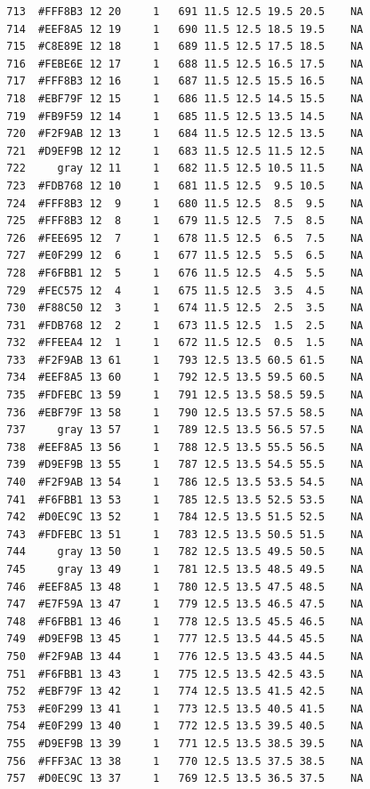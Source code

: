 \documentclass[12pt,twoside]{reedthesis}
\begin{document}
\begin{verbatim}
  713  #FFF8B3 12 20     1   691 11.5 12.5 19.5 20.5    NA
  714  #EEF8A5 12 19     1   690 11.5 12.5 18.5 19.5    NA
  715  #C8E89E 12 18     1   689 11.5 12.5 17.5 18.5    NA
  716  #FEBE6E 12 17     1   688 11.5 12.5 16.5 17.5    NA
  717  #FFF8B3 12 16     1   687 11.5 12.5 15.5 16.5    NA
  718  #EBF79F 12 15     1   686 11.5 12.5 14.5 15.5    NA
  719  #FB9F59 12 14     1   685 11.5 12.5 13.5 14.5    NA
  720  #F2F9AB 12 13     1   684 11.5 12.5 12.5 13.5    NA
  721  #D9EF9B 12 12     1   683 11.5 12.5 11.5 12.5    NA
  722     gray 12 11     1   682 11.5 12.5 10.5 11.5    NA
  723  #FDB768 12 10     1   681 11.5 12.5  9.5 10.5    NA
  724  #FFF8B3 12  9     1   680 11.5 12.5  8.5  9.5    NA
  725  #FFF8B3 12  8     1   679 11.5 12.5  7.5  8.5    NA
  726  #FEE695 12  7     1   678 11.5 12.5  6.5  7.5    NA
  727  #E0F299 12  6     1   677 11.5 12.5  5.5  6.5    NA
  728  #F6FBB1 12  5     1   676 11.5 12.5  4.5  5.5    NA
  729  #FEC575 12  4     1   675 11.5 12.5  3.5  4.5    NA
  730  #F88C50 12  3     1   674 11.5 12.5  2.5  3.5    NA
  731  #FDB768 12  2     1   673 11.5 12.5  1.5  2.5    NA
  732  #FFEEA4 12  1     1   672 11.5 12.5  0.5  1.5    NA
  733  #F2F9AB 13 61     1   793 12.5 13.5 60.5 61.5    NA
  734  #EEF8A5 13 60     1   792 12.5 13.5 59.5 60.5    NA
  735  #FDFEBC 13 59     1   791 12.5 13.5 58.5 59.5    NA
  736  #EBF79F 13 58     1   790 12.5 13.5 57.5 58.5    NA
  737     gray 13 57     1   789 12.5 13.5 56.5 57.5    NA
  738  #EEF8A5 13 56     1   788 12.5 13.5 55.5 56.5    NA
  739  #D9EF9B 13 55     1   787 12.5 13.5 54.5 55.5    NA
  740  #F2F9AB 13 54     1   786 12.5 13.5 53.5 54.5    NA
  741  #F6FBB1 13 53     1   785 12.5 13.5 52.5 53.5    NA
  742  #D0EC9C 13 52     1   784 12.5 13.5 51.5 52.5    NA
  743  #FDFEBC 13 51     1   783 12.5 13.5 50.5 51.5    NA
  744     gray 13 50     1   782 12.5 13.5 49.5 50.5    NA
  745     gray 13 49     1   781 12.5 13.5 48.5 49.5    NA
  746  #EEF8A5 13 48     1   780 12.5 13.5 47.5 48.5    NA
  747  #E7F59A 13 47     1   779 12.5 13.5 46.5 47.5    NA
  748  #F6FBB1 13 46     1   778 12.5 13.5 45.5 46.5    NA
  749  #D9EF9B 13 45     1   777 12.5 13.5 44.5 45.5    NA
  750  #F2F9AB 13 44     1   776 12.5 13.5 43.5 44.5    NA
  751  #F6FBB1 13 43     1   775 12.5 13.5 42.5 43.5    NA
  752  #EBF79F 13 42     1   774 12.5 13.5 41.5 42.5    NA
  753  #E0F299 13 41     1   773 12.5 13.5 40.5 41.5    NA
  754  #E0F299 13 40     1   772 12.5 13.5 39.5 40.5    NA
  755  #D9EF9B 13 39     1   771 12.5 13.5 38.5 39.5    NA
  756  #FFF3AC 13 38     1   770 12.5 13.5 37.5 38.5    NA
  757  #D0EC9C 13 37     1   769 12.5 13.5 36.5 37.5    NA

\end{verbatim}
\end{document}
